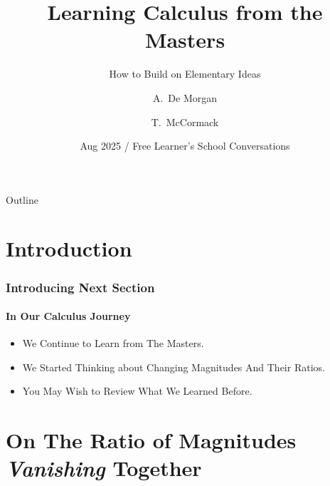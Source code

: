 \documentclass{beamer}
\title[Getting Started with Calculus] %
{Learning Calculus from the Masters}
\subtitle
{How to Build on Elementary Ideas} %
\author[Augustus De Morgan, Thomas McCormack, KM] %
{A.~De Morgan\inst{1} \and T.~McCormack\inst{2}}
\institute[SDUK] %
{
  \inst{1}%
  Original Author
  \and
  \inst{2}%
  First Maintainer
  }
\date[August 2025] %
{Aug 2025 / Free Learner's School Conversations}
\begin{document}
\begin{frame}
  \titlepage
\end{frame}

\begin{frame}{Outline}
  \tableofcontents
\end{frame}




\section{Introduction}
\begin{frame}
\frametitle{Introducing Next Section}
\framesubtitle{In Our Calculus Journey}
\label{slide:intro}
\begin{itemize}
\pause
\item We Continue to Learn from The Masters.
\pause
\item We Started Thinking about Changing Magnitudes And Their Ratios.
\pause
\item You May Wish to Review What We Learned Before.
\end{itemize}
\end{frame}

\section{On The Ratio of Magnitudes \textit{Vanishing} Together}
\end{document}
